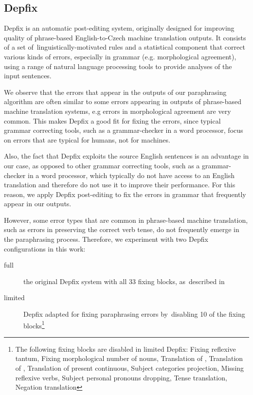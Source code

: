 \subsection{Depfix}
\label{depfix}
Depfix is an automatic post-editing system, originally designed for improving quality
of phrase-based English-to-Czech machine translation outputs. It consists of a
set of~linguistically-motivated rules and a statistical component that correct
various kinds of errors, especially in grammar (e.g. morphological agreement),
using a range of natural language processing tools to provide analyses of the
input sentences.

We observe that the errors that appear in the outputs of our paraphrasing
algorithm are often similar to some errors appearing in outputs of phrase-based
machine translation systems, e.g errors in morphological agreement are very common.
This makes Depfix a good fit for fixing the errors, since typical
grammar correcting tools, such as a grammar-checker in a word processor,
focus on errors that are typical for humans, not for machines.

Also, the fact that Depfix exploits the source English sentences is an advantage 
in our case, as opposed to other grammar correcting tools, such as a 
grammar-checker in a word processor, which typically do not have access to an 
English translation and therefore do not use it to improve their performance.
For this reason, we apply Depfix post-editing to fix the errors in grammar that 
frequently appear in our outputs.

However, some error types that are common in phrase-based machine translation, 
such as errors in preserving the correct verb tense, do not frequently emerge in the 
paraphrasing process.
Therefore, we experiment with two Depfix configurations in this work:
\begin{description}
\item[full] the original Depfix system with all 33 fixing blocks,
as~described in \cite{rosa:mgr}
\item[limited] Depfix adapted for fixing paraphrasing errors by~disabling 10 of
the fixing blocks\footnote{%
The following fixing blocks are disabled in limited Depfix:
Fixing reflexive tantum,
Fixing morphological number of nouns,
Translation of , 
Translation of , 
Translation of present continuous,
Subject categories projection,
Missing reflexive verbs,
Subject personal pronouns dropping,
Tense translation,
Negation translation}
\end{description}

